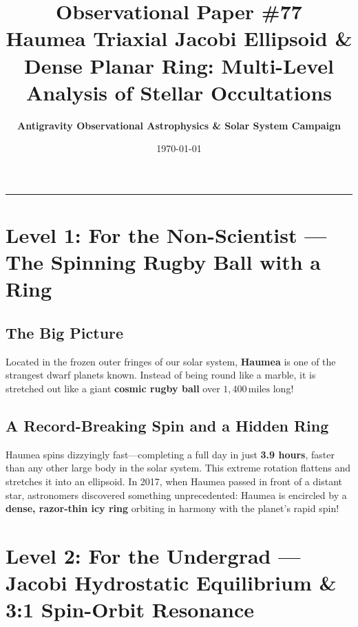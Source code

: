 \documentclass[11pt,a4paper]{article}
\title{\Huge \textbf{Observational Paper \#77}\\ \Large Haumea Triaxial Jacobi Ellipsoid \& Dense Planar Ring: Multi-Level Analysis of Stellar Occultations}
\author{\textbf{Antigravity Observational Astrophysics \& Solar System Campaign}}
\date{\today}
\begin{document}
\maketitle

\vspace{-1em}
\begin{center}
\rule{\textwidth}{1.5pt}
\end{center}

\section*{Level 1: For the Non-Scientist — The Spinning Rugby Ball with a Ring}

\subsection*{The Big Picture}
Located in the frozen outer fringes of our solar system, \textbf{Haumea} is one of the strangest dwarf planets known. Instead of being round like a marble, it is stretched out like a giant \textbf{cosmic rugby ball} over $1{,}400\,\text{miles}$ long!

\subsection*{A Record-Breaking Spin and a Hidden Ring}
Haumea spins dizzyingly fast—completing a full day in just \textbf{3.9 hours}, faster than any other large body in the solar system. This extreme rotation flattens and stretches it into an ellipsoid. In 2017, when Haumea passed in front of a distant star, astronomers discovered something unprecedented: Haumea is encircled by a \textbf{dense, razor-thin icy ring} orbiting in harmony with the planet's rapid spin!

\newpage

\section*{Level 2: For the Undergrad — Jacobi Hydrostatic Equilibrium \& 3:1 Spin-Orbit Resonance}
\end{document}
